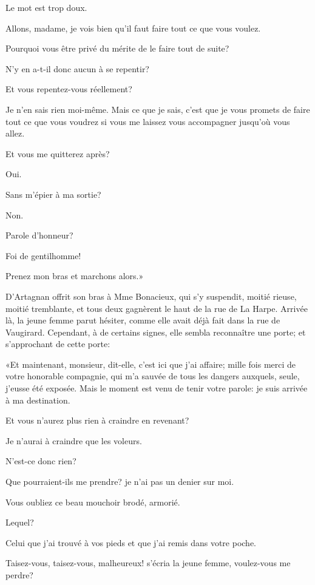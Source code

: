 \speak  Le mot est trop doux. 

\speak  Allons, madame, je vois bien qu'il faut faire tout ce que vous voulez. 

\speak  Pourquoi vous être privé du mérite de le faire tout de suite? 

\speak  N'y en a-t-il donc aucun à se repentir? 

\speak  Et vous repentez-vous réellement? 

\speak  Je n'en sais rien moi-même. Mais ce que je sais, c'est que je vous promets de faire tout ce que vous voudrez si vous me laissez vous accompagner jusqu'où vous allez. 

\speak  Et vous me quitterez après? 

\speak  Oui. 

\speak  Sans m'épier à ma sortie? 

\speak  Non. 

\speak  Parole d'honneur? 

\speak  Foi de gentilhomme! 

\speak  Prenez mon bras et marchons alors.» 

D'Artagnan offrit son bras à Mme Bonacieux, qui s'y suspendit, moitié rieuse, moitié tremblante, et tous deux gagnèrent le haut de la rue de La Harpe. Arrivée là, la jeune femme parut hésiter, comme elle avait déjà fait dans la rue de Vaugirard. Cependant, à de certains signes, elle sembla reconnaître une porte; et s'approchant de cette porte: 

«Et maintenant, monsieur, dit-elle, c'est ici que j'ai affaire; mille fois merci de votre honorable compagnie, qui m'a sauvée de tous les dangers auxquels, seule, j'eusse été exposée. Mais le moment est venu de tenir votre parole: je suis arrivée à ma destination. 

\speak  Et vous n'aurez plus rien à craindre en revenant? 

\speak  Je n'aurai à craindre que les voleurs. 

\speak  N'est-ce donc rien? 

\speak  Que pourraient-ils me prendre? je n'ai pas un denier sur moi. 

\speak  Vous oubliez ce beau mouchoir brodé, armorié. 

\speak  Lequel? 

\speak  Celui que j'ai trouvé à vos pieds et que j'ai remis dans votre poche. 

\speak  Taisez-vous, taisez-vous, malheureux! s'écria la jeune femme, voulez-vous me perdre? 

